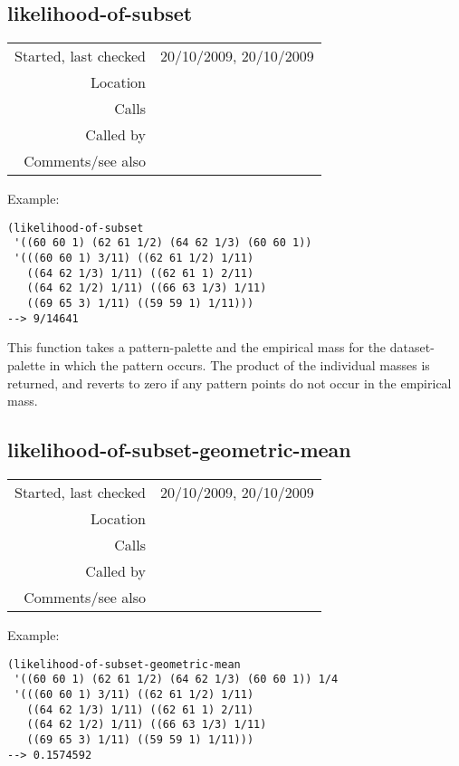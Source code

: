 \subsection*{likelihood-of-subset}\label{fun:likelihood-of-subset}

\vspace{0.3cm}
\begin{tabular}{r|p{8cm}}
Started, last checked & 20/10/2009, 20/10/2009 \\
Location & \nameref{sec:empirical-preliminaries} \\
Calls & \\
Called by & \nameref{fun:likelihood-of-pattern-or-translation} \\
Comments/see also & \nameref{fun:likelihood-of-subset-geometric-mean}
\end{tabular}

\vspace{0.5cm}
\noindent Example:
\begin{verbatim}
(likelihood-of-subset
 '((60 60 1) (62 61 1/2) (64 62 1/3) (60 60 1))
 '(((60 60 1) 3/11) ((62 61 1/2) 1/11)
   ((64 62 1/3) 1/11) ((62 61 1) 2/11)
   ((64 62 1/2) 1/11) ((66 63 1/3) 1/11)
   ((69 65 3) 1/11) ((59 59 1) 1/11)))
--> 9/14641
\end{verbatim}

\noindent This function takes a pattern-palette and
the empirical mass for the dataset-palette in which
the pattern occurs. The product of the individual
masses is returned, and reverts to zero if any pattern
points do not occur in the empirical mass.


\subsection*{likelihood-of-subset-geometric-mean}\label{fun:likelihood-of-subset-geometric-mean}

\vspace{0.3cm}
\begin{tabular}{r|p{8cm}}
Started, last checked & 20/10/2009, 20/10/2009 \\
Location & \nameref{sec:empirical-preliminaries} \\
Calls & \\
Called by & \nameref{fun:likelihood-of-translations-geometric-mean} \\
Comments/see also & \nameref{fun:likelihood-of-subset}
\end{tabular}

\vspace{0.5cm}
\noindent Example:
\begin{verbatim}
(likelihood-of-subset-geometric-mean
 '((60 60 1) (62 61 1/2) (64 62 1/3) (60 60 1)) 1/4
 '(((60 60 1) 3/11) ((62 61 1/2) 1/11)
   ((64 62 1/3) 1/11) ((62 61 1) 2/11)
   ((64 62 1/2) 1/11) ((66 63 1/3) 1/11)
   ((69 65 3) 1/11) ((59 59 1) 1/11)))
--> 0.1574592
\end{verbatim}

